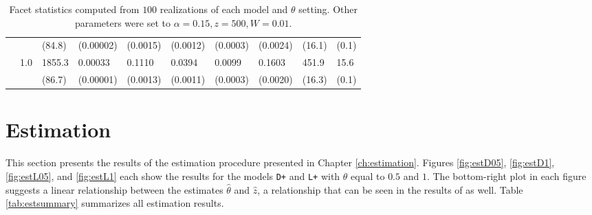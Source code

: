 \begin{landscape}
\begin{table}
\begin{tabular}{lrllllllll}
 & &  (84.8) &  (0.00002) &  (0.0015) &  (0.0012) &  (0.0003) &  (0.0024) &  (16.1) &  (0.1) \\
 & 1.0 &  1855.3 &  0.00033 &  0.1110 &  0.0394 &  0.0099 &  0.1603 &  451.9 &  15.6 \\
 & &  (86.7) &  (0.00001) &  (0.0013) &  (0.0011) &  (0.0003) &  (0.0020) &  (16.3) &  (0.1) \\
\bottomrule
\end{tabular}
\caption{Facet statistics computed from $100$ realizations of each model and $\theta$ setting. Other parameters were set to $\alpha=0.15, z=500, W=0.01$.}
\label{tab:facets}
\end{table}
\end{landscape}





\section{Estimation}
This section presents the results of the estimation procedure presented in Chapter \ref{ch:estimation}. Figures \ref{fig:estD05}, \ref{fig:estD1}, \ref{fig:estL05}, and \ref{fig:estL1} each show the results for the models \texttt{D+} and \texttt{L+}  with $\theta$ equal to $0.5$ and $1$. The bottom-right plot in each figure suggests a linear relationship between the estimates $\hat\theta$ and $\hat z$, a relationship that can be seen in the results of \cite{DereudreLavancier2011} as well.
Table \ref{tab:estsummary} summarizes all estimation results. 


